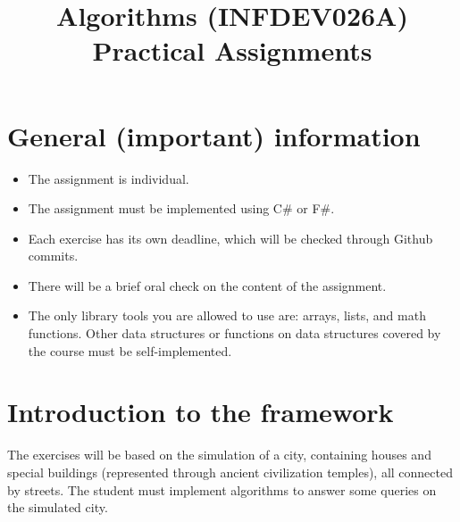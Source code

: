 \documentclass[10pt,a4paper]{article}
\title{Algorithms (INFDEV026A) \\ Practical Assignments}
\author { }
\date { }
\begin{document}
\maketitle

\vspace{-50pt}
\section*{General (important) information}
\begin{itemize}[noitemsep]
\item The assignment is individual.
\item The assignment must be implemented using C\# or F\#.
\item Each exercise has its own deadline, which will be checked through Github commits.
\item There will be a brief oral check on the content of the assignment.
\item The only library tools you are allowed to use are: arrays, lists, and math functions. Other data structures or functions on data structures covered by the course must be self-implemented.
\end{itemize}

\section*{Introduction to the framework}
The exercises will be based on the simulation of a city, containing houses and special buildings (represented through ancient civilization temples), all connected by streets. The student must implement algorithms to answer some queries on the simulated city.
\end{document}
